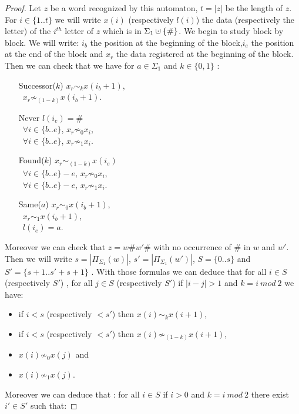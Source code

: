 \documentclass[a4paper,10pt]{report}
\newcommand{\stt}{\{1..t\}}
\newcommand{\sbe}{\{b..e\}}
\newcommand{\ses}{\{0..s\}}
\newcommand{\sesp}{\{s+1..s'+s+1\}}
\newcommand{\cupdot}{\mathbin{\mathaccent\cdot\cup}}
\begin{document}
  \begin{proof}
    Let $z$ be a word recognized by this automaton, $t= |z|$ be the length of $z$.
    For $i \in \stt$ we will write $x(i)$ (respectively $l(i)$) the data (respectively the letter) of the $i^{th}$ letter of $z$ which is in $\Sigma_1 \cupdot \{ \# \}$.  
    We begin to study block by block.
    We will write: $i_b$ the position at the beginning of the block,$i_e$ the position at the end of the block and $x_r$ the data registered at the beginning of the block. 
    Then we can check that we have for $a \in \Sigma_1$ and $k \in \{0,1\}$ :
    \begin{itemize}
      \item [Successor($k$)] 
      $x_r \sim_{k} x(i_b+1)$, \\\
      $x_r \not \sim_{(1-k)} x(i_b+1)$.
      \item [Never] 
      $l(i_e) = \#$ \\\
      $\forall i \in \sbe$,  $x_r \not \sim_{0} x_i$, \\\
      $\forall i \in \sbe$,  $x_r \not \sim_{1} x_i$.
      \item[Found($k$)] 
      $x_r \sim_{(1-k)} x(i_e)$ \\\
      $\forall i \in \sbe - e$,  $x_r \not \sim_{0} x_i$, \\\
     $\forall i \in \sbe - e $,  $x_r \not \sim_{1} x_i$.
     \item[Same($a$)] 
     $x_r \sim_{0} x(i_b+ 1)$, \\\
     $x_r \sim_{1} x(i_b+ 1)$, \\\
     $l(i_e) = a$.
    \end{itemize}
    Moreover we can check that $z=w\#w'\#$ with no occurrence of $\#$ in $w$ and $w'$.
    Then we will write $s=|\Pi_{\Sigma_1}(w)|$, $s'= |\Pi_{\Sigma_1}(w')|$, $S = \ses$ and $S' = \sesp$ .
    With those formulas we can deduce that for all $i \in S$ (respectively $S'$) , for all $j \in S $ (respectively $S'$) 
    if $|i-j| > 1 $ and $k = i\ mod\  2$ we have:
    \begin{itemize}
      \item if $i < s $ (respectively $ < s'$) then $x(i) \sim_k x(i +1)$,
      \item if $i < s $ (respectively $ < s'$) then $x(i) \not \sim_{(1-k)} x(i +1)$,
      \item $x(i) \not \sim_{0} x(j)$ and
      \item $x(i) \not \sim_{1} x(j)$.
    \end{itemize}
    Moreover we can deduce that : for all $i \in S$ if $i > 0$ and $k = i\ mod\  2$ there exist $i' \in S'$ such that:

\end{proof}
\end{document}
